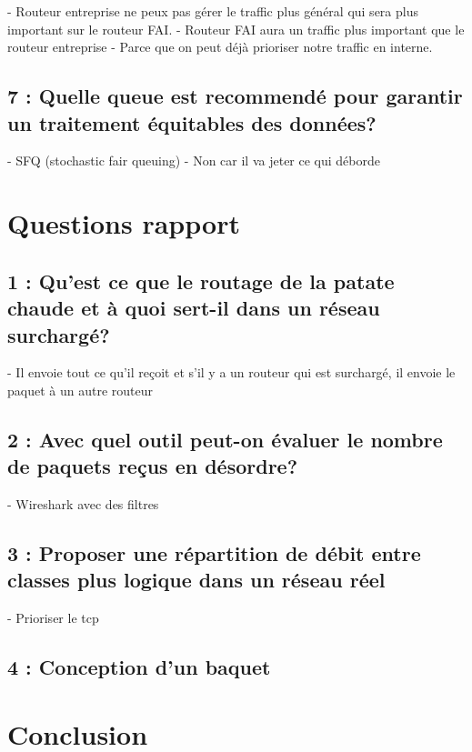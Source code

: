 \documentclass{article}
\begin{document}
- Routeur entreprise ne peux pas gérer le traffic plus général qui sera plus important sur le routeur FAI.
- Routeur FAI aura un traffic plus important que le routeur entreprise
- Parce que on peut déjà prioriser notre traffic en interne.

\subsection*{7 : Quelle queue est recommendé pour garantir un traitement équitables des données?}

- SFQ (stochastic fair queuing)
- Non car il va jeter ce qui déborde

\section{Questions rapport}

\subsection*{1 : Qu'est ce que le routage de la patate chaude et à quoi sert-il dans un réseau surchargé?}

- Il envoie tout ce qu'il reçoit et s'il y a un routeur qui est surchargé, il envoie le paquet à un autre routeur

\subsection{2 : Avec quel outil peut-on évaluer le nombre de paquets reçus en désordre?}

- Wireshark avec des filtres

\subsection*{3 : Proposer une répartition de débit entre classes plus logique dans un réseau réel}

- Prioriser le tcp

\subsection*{4 : Conception d'un baquet}




\section{Conclusion}



\printbibliography
\end{document}
